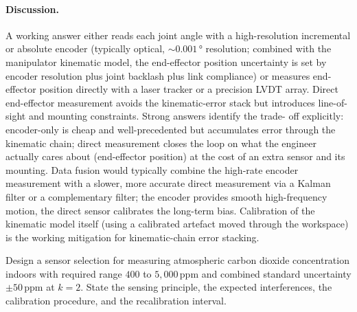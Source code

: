 \paragraph{Discussion.} A working answer either reads each joint
angle with a high-resolution incremental or absolute encoder
(typically optical, $\sim 0.001 \,\si{\degree}$ resolution; combined
with the manipulator kinematic model, the end-effector position
uncertainty is set by encoder resolution plus joint backlash plus
link compliance) or measures end-effector position directly with a
laser tracker or a precision LVDT array. Direct end-effector
measurement avoids the kinematic-error stack but introduces line-of-
sight and mounting constraints. Strong answers identify the trade-
off explicitly: encoder-only is cheap and well-precedented but accumulates
error through the kinematic chain; direct measurement closes the
loop on what the engineer actually cares about (end-effector
position) at the cost of an extra sensor and its mounting. Data
fusion would typically combine the high-rate encoder measurement
with a slower, more accurate direct measurement via a Kalman
filter or a complementary filter; the encoder provides smooth
high-frequency motion, the direct sensor calibrates the long-term
bias. Calibration of the kinematic model itself (using a
calibrated artefact moved through the workspace) is the working
mitigation for kinematic-chain error stacking.

\begin{exercise}
Design a sensor selection for measuring atmospheric carbon dioxide
concentration indoors with required range $400$ to
$5{,}000\,\text{ppm}$ and combined standard uncertainty
$\pm 50\,\text{ppm}$ at $k = 2$. State the sensing principle, the
expected interferences, the calibration procedure, and the
recalibration interval.
\end{exercise}

